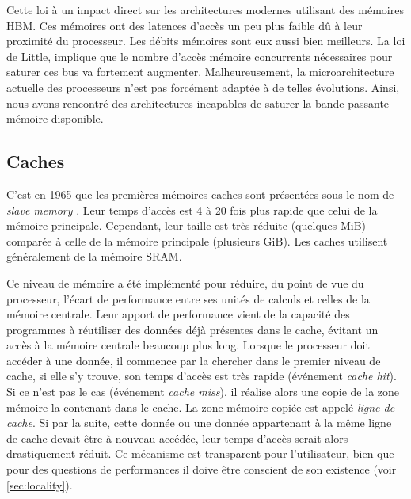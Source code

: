         Cette loi à un impact direct sur les architectures modernes utilisant des mémoires HBM. Ces mémoires ont des latences d’accès un peu plus faible dû à leur proximité du processeur. Les débits mémoires sont eux aussi bien meilleurs. La loi de Little, implique que le nombre d’accès mémoire concurrents nécessaires pour saturer ces bus va fortement augmenter. Malheureusement, la microarchitecture actuelle des processeurs n’est pas forcément adaptée à de telles évolutions. Ainsi, nous avons rencontré des architectures incapables de saturer la bande passante mémoire disponible. 




\subsection{Caches} \label{sec:cache}
    
    C'est en 1965 que les premières mémoires caches sont présentées sous le nom de \textit{slave memory} \cite{wilkes1965slave}. Leur temps d'accès est 4 à 20 fois plus rapide que celui de la mémoire principale. Cependant, leur taille est très réduite (quelques MiB) comparée à celle de la mémoire principale (plusieurs GiB). Les caches utilisent généralement de la mémoire SRAM.
    
    Ce niveau de mémoire a été implémenté pour réduire, du point de vue du processeur, l'écart de performance entre ses unités de calculs et celles de la mémoire centrale. Leur apport de performance vient de la capacité des programmes à réutiliser des données déjà présentes dans le cache, évitant un accès à la mémoire centrale beaucoup plus long. Lorsque le processeur doit accéder à une donnée, il commence par la chercher dans le premier niveau de cache, si elle s’y trouve, son temps d'accès est très rapide (événement \textit{cache hit}). Si ce n'est pas le cas (événement \textit{cache miss}), il réalise alors une copie de la zone mémoire la contenant dans le cache. La zone mémoire copiée est appelé \textit{ligne de cache}. Si par la suite, cette donnée ou une donnée appartenant à la même ligne de cache devait être à nouveau accédée, leur temps d'accès serait alors drastiquement réduit. Ce mécanisme est transparent pour l'utilisateur, bien que pour des questions de performances il doive être conscient de son existence (voir \autoref{sec:locality}). 
    
